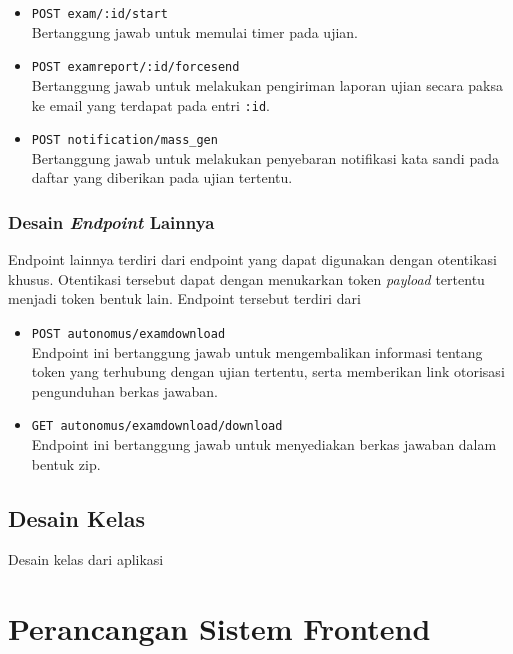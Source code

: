 \begin{itemize}
        \item \texttt{POST exam/:id/start} \\
            Bertanggung jawab untuk memulai timer pada ujian.
            
        \item \texttt{POST examreport/:id/forcesend} \\
            Bertanggung jawab untuk melakukan pengiriman laporan ujian secara paksa ke email
            yang terdapat pada entri \texttt{:id}.
            
        \item \texttt{POST notification/mass\_gen} \\
            Bertanggung jawab untuk melakukan penyebaran notifikasi kata sandi pada daftar yang
            diberikan pada ujian tertentu.
    \end{itemize}
    
\subsubsection{Desain \textit{Endpoint} Lainnya}
    Endpoint lainnya terdiri dari endpoint yang dapat digunakan dengan otentikasi khusus. Otentikasi tersebut
    dapat dengan menukarkan token \textit{payload} tertentu menjadi token bentuk lain. Endpoint tersebut
    terdiri dari
    \begin{itemize}
        \item \texttt{POST autonomus/examdownload} \\
            Endpoint ini bertanggung jawab untuk mengembalikan informasi tentang token yang terhubung
            dengan ujian tertentu, serta memberikan link otorisasi pengunduhan berkas jawaban.
            
        \item \texttt{GET autonomus/examdownload/download} \\
            Endpoint ini bertanggung jawab untuk menyediakan berkas jawaban dalam bentuk zip.
    \end{itemize}
    
\subsection{Desain Kelas}
    Desain kelas dari aplikasi
    
\section{Perancangan Sistem Frontend}
    

